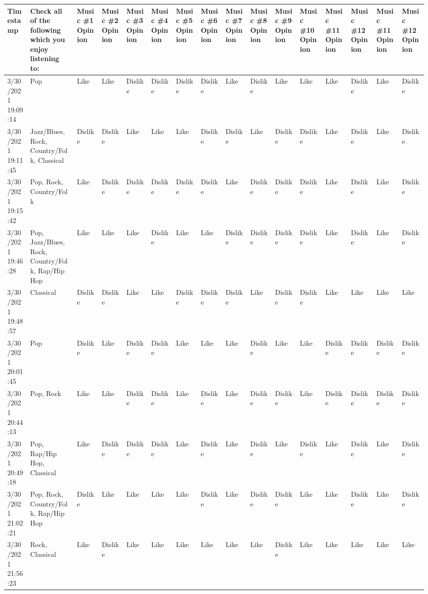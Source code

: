 ﻿\begin{table}
    \centering
    \begin{tabular}{|l|l|l|l|l|l|l|l|l|l|l|l|l|l|l|l|}
    \hline
        Timestamp & Check all of the following which you enjoy listening to: & Music \#1 Opinion & Music \#2 Opinion & Music \#3 Opinion & Music \#4 Opinion & Music \#5 Opinion & Music \#6 Opinion & Music \#7 Opinion & Music \#8 Opinion & Music \#9 Opinion & Music \#10 Opinion & Music \#11 Opinion & Music \#12 Opinion & Music \#11 Opinion & Music \#12 Opinion \\ \hline
        3/30/2021 19:09:14 & Pop & Like & Like & Dislike & Dislike & Dislike & Dislike & Like & Dislike & Like & Like & Like & Dislike & Like & Dislike \\ \hline
        3/30/2021 19:11:45 & Jazz/Blues, Rock, Country/Folk, Classical & Dislike & Dislike & Like & Like & Like & Dislike & Dislike & Like & Dislike & Dislike & Like & Dislike & Like & Dislike \\ \hline
        3/30/2021 19:15:42 & Pop, Rock, Country/Folk & Like & Dislike & Dislike & Dislike & Dislike & Dislike & Like & Dislike & Dislike & Dislike & Like & Dislike & Like & Dislike \\ \hline
        3/30/2021 19:46:28 & Pop, Jazz/Blues, Rock, Country/Folk, Rap/Hip Hop & Like & Like & Like & Dislike & Like & Like & Dislike & Dislike & Dislike & Dislike & Like & Dislike & Like & Dislike \\ \hline
        3/30/2021 19:48:57 & Classical & Dislike & Dislike & Like & Like & Dislike & Dislike & Dislike & Like & Dislike & Dislike & Like & Like & Like & Like \\ \hline
        3/30/2021 20:01:45 & Pop & Dislike & Like & Dislike & Dislike & Like & Like & Like & Dislike & Like & Like & Dislike & Dislike & Dislike & Dislike \\ \hline
        3/30/2021 20:44:13 & Pop, Rock & Like & Like & Dislike & Dislike & Like & Dislike & Like & Dislike & Dislike & Like & Dislike & Dislike & Dislike & Dislike \\ \hline
        3/30/2021 20:49:18 & Pop, Rap/Hip Hop, Classical & Like & Dislike & Dislike & Dislike & Like & Dislike & Like & Dislike & Like & Dislike & Like & Dislike & Like & Dislike \\ \hline
        3/30/2021 21:02:21 & Pop, Rock, Country/Folk, Rap/Hip Hop & Dislike & Like & Like & Like & Like & Dislike & Like & Dislike & Dislike & Like & Like & Dislike & Like & Dislike \\ \hline
        3/30/2021 21:56:23 & Rock, Classical & Like & Dislike & Like & Like & Like & Like & Like & Like & Dislike & Like & Like & Like & Like & Like \\ \hline

\end{tabular}
\end{table}
